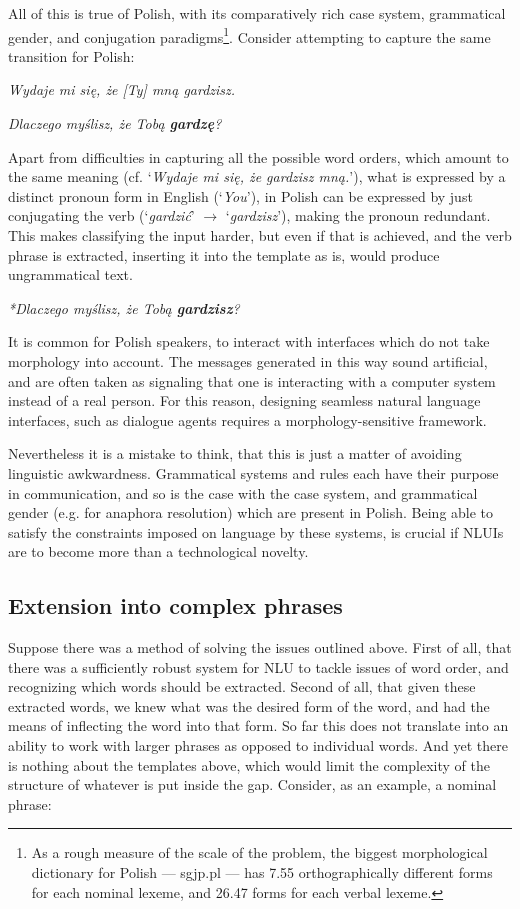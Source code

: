 \documentclass[12pt]{article}
\newcommand{\gloss}[1]{\vspace{10pt}\indent\textit{#1}\vspace{5pt}}
\newcommand{\inlinegloss}[1]{`\textit{#1}'}
\begin{document}
All of this is true of Polish, with its comparatively rich case system, grammatical gender, and conjugation paradigms{\footnote{As a rough measure of the scale of the problem, the biggest morphological dictionary for Polish --- sgjp.pl --- has 7.55 orthographically different forms for each nominal lexeme, and 26.47 forms for each verbal lexeme.}}. Consider attempting to capture the same transition for Polish:

\gloss{Wydaje mi się, że [Ty] mną gardzisz.}

\gloss{Dlaczego myślisz, że Tobą \textbf{gardzę}?}

Apart from difficulties in capturing all the possible word orders, which amount to the same meaning (cf. \inlinegloss{Wydaje mi się, że gardzisz mną.}), what is expressed by a distinct pronoun form in English (\inlinegloss{You}), in Polish can be expressed by just conjugating the verb (\inlinegloss{gardzić} $\rightarrow$ \inlinegloss{gardzisz}), making the pronoun redundant. This makes classifying the input harder, but even if that is achieved, and the verb phrase is extracted, inserting it into the template as is, would produce ungrammatical text.

\gloss{*Dlaczego myślisz, że Tobą \textbf{gardzisz}?}

It is common for Polish speakers, to interact with interfaces which do not take morphology into account. The messages generated in this way sound artificial, and are often taken as signaling that one is interacting with a computer system instead of a real person. For this reason, designing seamless natural language interfaces, such as dialogue agents requires a morphology-sensitive framework.

Nevertheless it is a mistake to think, that this is just a matter of avoiding linguistic awkwardness. Grammatical systems and rules each have their purpose in communication, and so is the case with the case system, and grammatical gender (e.g. for anaphora resolution) which are present in Polish. Being able to satisfy the constraints imposed on language by these systems, is crucial if NLUIs are to become more than a technological novelty.

\subsection{Extension into complex phrases}
Suppose there was a method of solving the issues outlined above. First of all, that there was a sufficiently robust system for NLU to tackle issues of word order, and recognizing which words should be extracted. Second of all, that given these extracted words, we knew what was the desired form of the word, and had the means of inflecting the word into that form. So far this does not translate into an ability to work with larger phrases as opposed to individual words. And yet there is nothing about the templates above, which would limit the complexity of the structure of whatever is put inside the gap. Consider, as an example, a nominal phrase:
\end{document}
